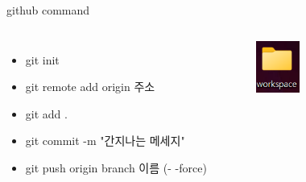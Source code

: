 \documentclass[12pt]{beamer}
\begin{document}
\begin{frame}{github command}
    \begin{columns}
            \begin{itemize}
                \item git init \newline
                \item git remote add origin 주소\newline
                \item git add . \newline
                \item git commit -m "간지나는 메세지" \newline
                \item git push origin branch 이름 (- -force)
            \end{itemize}

            \begin{figure}[t]
            \centering
            \includegraphics[width=0.7\textwidth]{image/workspace.png}
            \end{figure}
    \end{columns}
\end{frame}
\end{document}
